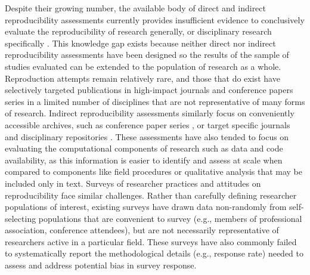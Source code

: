 \documentclass[]{interact}
\theoremstyle{plain}%
\theoremstyle{definition}
\theoremstyle{remark}
\begin{document}
Despite their growing number, the available body of direct and indirect reproducibility assessments currently provides insufficient evidence to conclusively evaluate the reproducibility of research generally, or disciplinary research specifically \citep{NASEM2019}.
This knowledge gap exists because neither direct nor indirect reproducibility assessments have been designed so the results of the sample of studies evaluated can be extended to the population of research as a whole. 
Reproduction attempts remain relatively rare, and those that do exist \citep[see][]{chang2015economics, moraila2014measuring} have selectively targeted publications in high-impact journals and conference papers series in a limited number of disciplines that are not representative of many forms of research.    
Indirect reproducibility assessments similarly focus on conveniently accessible archives, such as conference paper series \citep{gundersen2018state, ostermann2017}, or target specific journals and disciplinary repositories \citep{stodden2018empirical, stodden2018enabling, byrne_2017}.
These assessments have also tended to focus on evaluating the computational components of research such as data and code availability, as this information is easier to identify and assess at scale when compared to components like field procedures or qualitative analysis that may be included only in text. 
Surveys of researcher practices and attitudes on reproducibility face similar challenges. 
Rather than carefully defining researcher populations of interest, existing surveys have drawn data non-randomly from self-selecting populations that are convenient to survey (e.g., members of professional association, conference attendees), but are not necessarily representative of researchers active in a particular field. 
These surveys have also commonly failed to systematically report the methodological details (e.g., response rate) needed to assess and address potential bias in survey response. 
\end{document}
